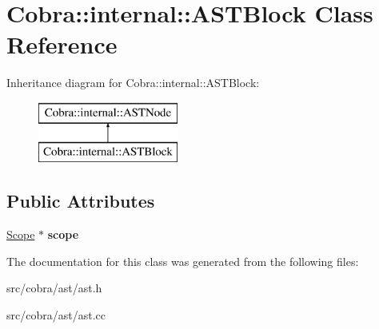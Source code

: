 \hypertarget{class_cobra_1_1internal_1_1_a_s_t_block}{\section{Cobra\+:\+:internal\+:\+:A\+S\+T\+Block Class Reference}
\label{class_cobra_1_1internal_1_1_a_s_t_block}
}
Inheritance diagram for Cobra\+:\+:internal\+:\+:A\+S\+T\+Block\+:\begin{figure}[H]
\begin{center}
\leavevmode
\includegraphics[height=2.000000cm]{class_cobra_1_1internal_1_1_a_s_t_block}
\end{center}
\end{figure}
\subsection*{Public Attributes}
\begin{DoxyCompactItemize}
\item 
\hypertarget{class_cobra_1_1internal_1_1_a_s_t_block_a738bd59c10dea2aef7d0bfed7da854a9}{\hyperlink{class_cobra_1_1internal_1_1_scope}{Scope} $\ast$ {\bfseries scope}}\label{class_cobra_1_1internal_1_1_a_s_t_block_a738bd59c10dea2aef7d0bfed7da854a9}

\end{DoxyCompactItemize}


The documentation for this class was generated from the following files\+:\begin{DoxyCompactItemize}
\item 
src/cobra/ast/ast.\+h\item 
src/cobra/ast/ast.\+cc\end{DoxyCompactItemize}
